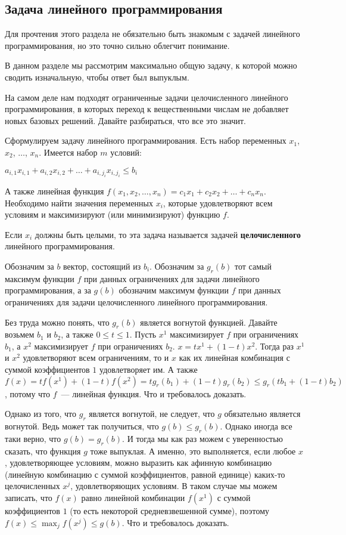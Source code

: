 \subsection{Задача линейного программирования}

Для прочтения этого раздела не обязательно быть знакомым с задачей линейного программирования, но это точно сильно облегчит понимание.

В данном разделе мы рассмотрим максимально общую задачу, к которой можно сводить изначальную, чтобы ответ был выпуклым.

На самом деле нам подходят ограниченные задачи целочисленного линейного программирования, в которых переход к вещественными числам не добавляет новых базовых решений. Давайте разбираться, что все это значит.

\begin{definition}
    Сформулируем задачу линейного программирования. Есть набор переменных $x_1$, $x_2$, $\ldots$, $x_n$. Имеется набор $m$ условий:

    $a_{i, 1} x_{i, 1} + a_{i, 2} x_{i, 2} + \ldots + a_{i, j_i} x_{i, j_i} \le b_i$

    А также линейная функция $f(x_1, x_2, \ldots, x_n) = c_1 x_1 + c_2 x_2 + \ldots + c_n x_n$. Необходимо найти значения переменных $x_i$, которые удовлетворяют всем условиям и максимизируют (или минимизируют) функцию $f$.

    Если $x_i$ должны быть целыми, то эта задача называется задачей \textbf{целочисленного} линейного программирования.
\end{definition}


Обозначим за $b$ вектор, состоящий из $b_i$. Обозначим за $g_r(b)$ тот самый максимум функции $f$ при данных ограничениях для задачи линейного программирования, а за $g(b)$ обозначим максимум функции $f$ при данных ограничениях для задачи целочисленного линейного программирования.

Без труда можно понять, что $g_r(b)$ является вогнутой функцией. Давайте возьмем $b_1$ и $b_2$, а также $0 \le t \le 1$. Пусть $x^1$ максимизирует $f$ при ограничениях $b_1$, а $x^2$ максимизирует $f$ при ограничениях $b_2$. $x = t x^1 + (1 - t) x^2$. Тогда раз $x^1$ и $x^2$ удовлетворяют всем ограничениям, то и $x$ как их линейная комбинация с суммой коэффициентов $1$ удовлетворяет им. А также $f(x) = t f(x^1) + (1 - t)f(x^2) = tg_r(b_1) + (1-t)g_r(b_2) \le g_r(tb_1 + (1-t)b_2)$, потому что $f$~--- линейная функция. Что и требовалось доказать.

Однако из того, что $g_r$ является вогнутой, не следует, что $g$ обязательно является вогнутой. Ведь может так получиться, что $g(b) \le g_r(b)$. Однако иногда все таки верно, что $g(b) = g_r(b)$. И тогда мы как раз можем с уверенностью сказать, что функция $g$ тоже выпуклая. А именно, это выполняется, если любое $x$, удовлетворяющее условиям, можно выразить как афинную комбинацию (линейную комбинацию с суммой коэффициентов, равной единице) каких-то целочисленных $x^j$, удовлетворяющих условиям. В таком случае мы можем записать, что $f(x)$ равно линейной комбинации $f(x^1)$ с суммой коэффициентов $1$ (то есть некоторой средневзвешенной сумме), поэтому $f(x) \le \max_j f(x^j) \le g(b)$. Что и требовалось доказать.

